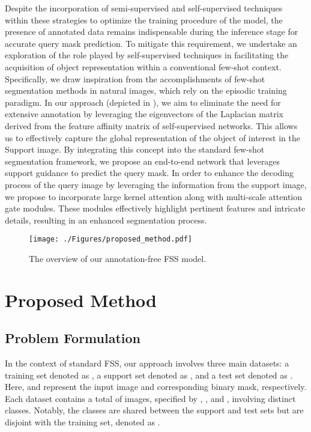 \documentclass[runningheads]{llncs}
\begin{document}
Despite the incorporation of semi-supervised and self-supervised techniques within these strategies to optimize the training procedure of the model, the presence of annotated data remains indispensable during the inference stage for accurate query mask prediction. To mitigate this requirement, we undertake an exploration of the role played by self-supervised techniques in facilitating the acquisition of object representation within a conventional few-shot context. Specifically, we draw inspiration from the accomplishments of few-shot segmentation methods in natural images, which rely on the episodic training paradigm. In our approach (depicted in ),  we aim to eliminate the need for extensive annotation by leveraging the eigenvectors of the Laplacian matrix derived from the feature affinity matrix of self-supervised networks. This allows us to effectively capture the global representation of the object of interest in the Support image. By integrating this concept into the standard few-shot segmentation framework,  we propose an end-to-end network that leverages support guidance to predict the query mask. In order to enhance the decoding process of the query image by leveraging the information from the support image,  we propose to incorporate large kernel attention along with multi-scale attention gate modules. These modules effectively highlight pertinent features and intricate details, resulting in an enhanced segmentation process.

\begin{figure}[!th]
    \centering
    \texttt{[image: ./Figures/proposed\_method.pdf]}
    \caption{The overview of our annotation-free FSS model.}
    \label{fig:proposed-method}
\end{figure}

\section{Proposed Method} 
\subsection{Problem Formulation}
\label{subsec:problem}
In the context of standard FSS, our approach involves three main datasets: a training set denoted as , a support set denoted as , and a test set denoted as . Here,  and  represent the input image and corresponding binary mask, respectively. Each dataset contains a total of  images, specified by , , and , involving  distinct classes. Notably, the classes are shared between the support and test sets but are disjoint with the training set, denoted as .
\end{document}
